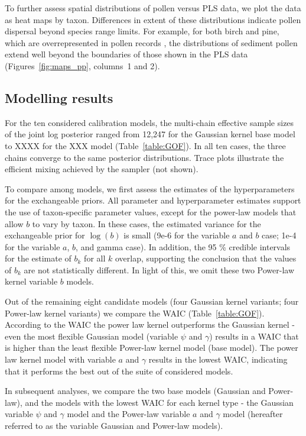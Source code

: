 \documentclass[12pt]{article}
\begin{document}
To further assess spatial distributions of pollen versus PLS data, we
plot the data as heat maps by taxon. Differences in extent of these
distributions indicate pollen dispersal beyond species range
limits. For example, for both birch and pine, which are
overrepresented in pollen records \citep{webb1981estimating,
  bradshaw1985relationships, jackson1990, williams2003palynological},
the distributions of sediment pollen extend well beyond the boundaries
of those shown in the PLS data (Figures~\ref{fig:maps_pp}, columns~1
and 2).

\subsection{Modelling results}

For the ten considered calibration models, the multi-chain effective
sample sizes of the joint log posterior ranged from 12,247 for the
Gaussian kernel base model to XXXX for the XXX model
(Table~\ref{table:GOF}). In all ten cases, the three chains converge
to the same posterior distributions. Trace plots illustrate the
efficient mixing achieved by the sampler (not shown).

To compare among models, we first assess the estimates of the
hyperparameters for the exchangeable priors. All parameter and
hyperparameter estimates support the use of taxon-specific parameter
values, except for the power-law models that allow $b$ to vary by
taxon. In these cases, the estimated variance for the exchangeable
prior for $\log ( b )$ is small (9e-6 for the variable $a$ and $b$
case; 1e-4 for the variable $a$, $b$, and gamma case). In addition,
the 95 \% credible intervals for the estimate of $b_k$ for all $k$
overlap, supporting the conclusion that the values of $b_k$ are not
statistically different. In light of this, we omit these two
Power-law kernel variable $b$ models.

Out of the remaining eight candidate models (four Gaussian kernel
variants; four Power-law kernel variants) we compare the WAIC
(Table~\ref{table:GOF}). According to the WAIC the power law kernel
outperforms the Gaussian kernel - even the most flexible Gaussian
model (variable $\psi$ and $\gamma$) results in a WAIC that is higher
than the least flexible Power-law kernel model (base model). The power
law kernel model with variable $a$ and $\gamma$ results in the lowest
WAIC, indicating that it performs the best out of the suite of
considered models. 

In subsequent analyses, we compare the two base models (Gaussian and
Power-law), and the models with the lowest WAIC for each kernel type -
the Gaussian variable $\psi$ and $\gamma$ model and the Power-law
variable $a$ and $\gamma$ model (hereafter referred to as the variable
Gaussian and Power-law models).
\end{document}
